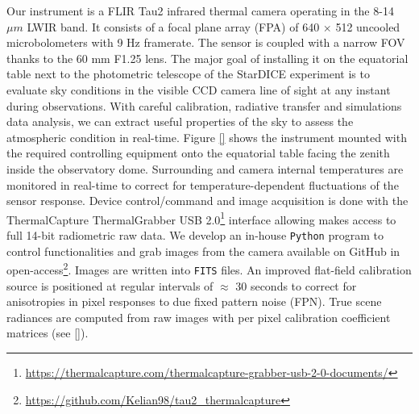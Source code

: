 \documentclass{article}
\begin{document}
Our instrument is a FLIR Tau2 infrared thermal camera operating in the 8-14 $\mu m$ LWIR band. It consists of a focal plane array (FPA) of 640 $\times$ 512 uncooled microbolometers with 9 Hz framerate. The sensor is coupled with a narrow FOV thanks to the 60 mm F1.25 lens. The major goal of installing it on the equatorial table next to the photometric telescope of the StarDICE experiment is to evaluate sky conditions in the visible CCD camera line of sight at any instant during observations. With careful calibration, radiative transfer and simulations data analysis, we can extract useful properties of the sky to assess the atmospheric condition in real-time. Figure \ref{} shows the instrument mounted with the required controlling equipment onto the equatorial table facing the zenith inside the observatory dome. Surrounding and camera internal temperatures are monitored in real-time to correct for temperature-dependent fluctuations of the sensor response. Device control/command and image acquisition is done with the ThermalCapture ThermalGrabber USB 2.0\footnote{\url{https://thermalcapture.com/thermalcapture-grabber-usb-2-0-documents/}} interface allowing makes access to full 14-bit radiometric raw data. We develop an in-house \texttt{Python} program to control functionalities and grab images from the camera available on GitHub in open-access\footnote{\url{https://github.com/Kelian98/tau2_thermalcapture}}. Images are written into \texttt{FITS} files. An improved flat-field calibration source is positioned at regular intervals of $\approx$ 30 seconds to correct for anisotropies in pixel responses to due fixed pattern noise (FPN). True scene radiances are computed from raw images with per pixel calibration coefficient matrices (see \ref{}).
\end{document}
